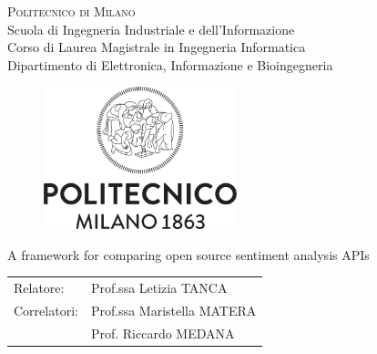 \begin{titlepage}

\begin{center}
\Large{\textsc{Politecnico di Milano}}\\
\Large{Scuola di Ingegneria Industriale e dell'Informazione}\\
\large{Corso di Laurea Magistrale in Ingegneria Informatica}\\
\large{Dipartimento di Elettronica, Informazione e Bioingegneria}
\par\end{center}

\vspace{0.5cm}


\begin{center}
\begin{figure}[h]
\centering{}\includegraphics[width=0.5\textwidth]{00-frontpage/logo-polimi.png}
\end{figure}
\vspace{1cm}

\par\end{center}

\begin{center}
\LARGE{A framework for comparing open source sentiment analysis APIs}\vspace{2cm}

\par\end{center}

\begin{flushleft}
\begin{tabular}{ll}
Relatore:  & Prof.ssa Letizia TANCA\tabularnewline
Correlatori:  & Prof.ssa Maristella MATERA\tabularnewline
	& Prof. Riccardo MEDANA
\end{tabular}\vspace{1cm}

\par\end{flushleft}


\end{titlepage}

